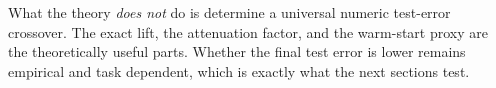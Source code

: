 What the theory \emph{does not} do is determine a universal numeric test-error crossover. The exact lift, the attenuation factor, and the warm-start proxy are the theoretically useful parts. Whether the final test error is lower remains empirical and task dependent, which is exactly what the next sections test.
